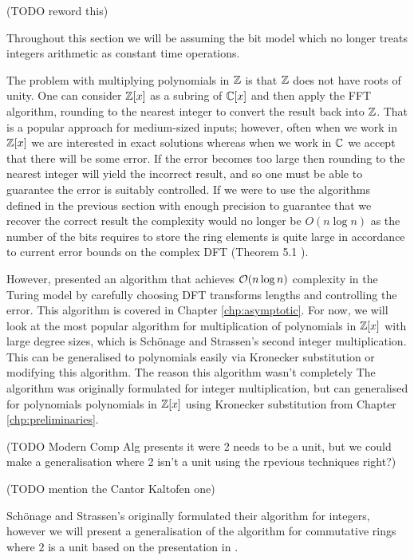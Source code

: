 (TODO reword this)

Throughout this section we will be assuming the bit model which no longer treats integers arithmetic as constant time operations.

The problem with multiplying polynomials in ${\mathbb Z}$ is that ${\mathbb Z}$ does not have roots of unity. One can consider ${\mathbb Z}[x]$ as a subring of ${\mathbb C}[x]$ and then apply the FFT algorithm, rounding to the nearest integer to convert the result back into ${\mathbb Z}$. That is a popular approach for medium-sized inputs; however, often when we work in ${\mathbb Z}[x]$ we are interested in exact solutions whereas when we work in ${\mathbb C}$ we accept that there will be some error. If the error becomes too large then rounding to the nearest integer will yield the incorrect result, and so one must be able to guarantee the error is suitably controlled. If we were to use the algorithms defined in the previous section with enough precision to guarantee that we recover the correct result the complexity would no longer be $O(n \log n)$ as the number of the bits requires to store the ring elements is quite large in accordance to current error bounds on the complex DFT (Theorem 5.1 \cite{fft-error}).

However, \cite{nlogn} presented an algorithm that achieves $\mathcal O(n\log n)$ complexity in the Turing model by carefully choosing DFT transforms lengths and controlling the error. This algorithm is covered in Chapter \ref{chp:asymptotic}. For now, we will look at the most popular algorithm for multiplication of polynomials in ${\mathbb Z}[x]$ with large degree sizes, which is Sch\"{o}nage and Strassen's second integer multiplication. This can be generalised to polynomials easily via Kronecker substitution or modifying this algorithm. The reason this algorithm wasn't completely The algorithm was originally formulated for integer multiplication, but can generalised for polynomials polynomials in ${\mathbb Z}[x]$ using Kronecker substitution from Chapter \ref{chp:preliminaries}.

\medskip

(TODO Modern Comp Alg presents it were 2 needs to be a unit, but we could make a generalisation where 2 isn't a unit using the rpevious techniques right?)

(TODO mention the Cantor Kaltofen one)

Sch\"{o}nage and Strassen's originally formulated their algorithm for integers, however we will present a generalisation of the algorithm for commutative rings where $2$ is a unit based on the presentation in \cite{modern-comp-alg}.

